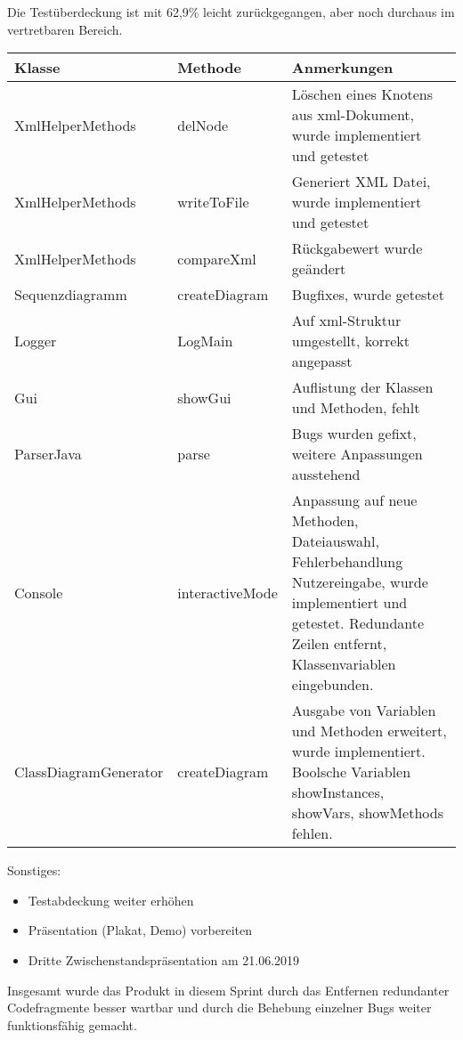 Die Testüberdeckung ist mit 62,9\% leicht zurückgegangen, aber noch durchaus im vertretbaren Bereich.
\nsecend%

\begin{table}[H]

\begin{tabularx}{\textwidth}{ |l|l|X| }
\hline
\textbf{Klasse} & \textbf{Methode} & \textbf{Anmerkungen}\\
 \hline
XmlHelperMethods & delNode & Löschen eines Knotens aus xml-Dokument, wurde implementiert und getestet\\ \hline
XmlHelperMethods & writeToFile & Generiert XML Datei, wurde implementiert und getestet\\ \hline
XmlHelperMethods & compareXml & Rückgabewert wurde geändert \\ \hline
Sequenzdiagramm & createDiagram & Bugfixes, wurde getestet\\\hline
Logger & LogMain & Auf xml-Struktur umgestellt, korrekt angepasst\\\hline
Gui & showGui & Auflistung der Klassen und Methoden, fehlt\\\hline
ParserJava & parse & Bugs wurden gefixt, weitere Anpassungen ausstehend \\ \hline
Console & interactiveMode & Anpassung auf neue Methoden, Dateiauswahl, Fehlerbehandlung Nutzereingabe, wurde implementiert und getestet. Redundante Zeilen entfernt, Klassenvariablen eingebunden. \\ \hline
ClassDiagramGenerator & createDiagram & Ausgabe von Variablen und Methoden erweitert, wurde implementiert. Boolsche Variablen showInstances, showVars, showMethods fehlen.\\ \hline
\end{tabularx}
\end{table}

Sonstiges:
\begin{itemize}
\item Testabdeckung weiter erhöhen
\item Präsentation (Plakat, Demo) vorbereiten
\item Dritte Zwischenstandspräsentation am 21.06.2019
\end{itemize}
\nsecend%

Insgesamt wurde das Produkt in diesem Sprint durch das Entfernen redundanter Codefragmente besser wartbar und durch die Behebung einzelner Bugs weiter funktionsfähig gemacht.
\nsecend%

